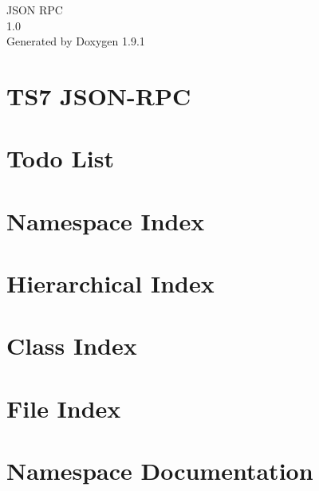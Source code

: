 \let\mypdfximage\pdfximage\def\pdfximage{\immediate\mypdfximage}\documentclass[twoside]{book}
\newcommand{\+}{\discretionary{\mbox{\scriptsize$\hookleftarrow$}}{}{}}
\newcommand{\clearemptydoublepage}{%
  \newpage{\pagestyle{empty}\cleardoublepage}%
}
\begin{document}
\raggedbottom

\hypersetup{pageanchor=false,
             bookmarksnumbered=true,
             pdfencoding=unicode
            }
\begin{titlepage}
\vspace*{7cm}
\begin{center}%
{\Large JSON RPC \\[1ex]\large 1.\+0 }\\
\vspace*{1cm}
{\large Generated by Doxygen 1.9.1}\\
\end{center}
\end{titlepage}
\clearemptydoublepage
{}
\tableofcontents
\clearemptydoublepage
{}
\hypersetup{pageanchor=true}

\chapter{TS7 JSON-\/\+RPC}
\label{index}\hypertarget{index}{}
\chapter{Todo List}
\label{todo}

\chapter{Namespace Index}

\chapter{Hierarchical Index}

\chapter{Class Index}

\chapter{File Index}

\chapter{Namespace Documentation}










\end{document}
